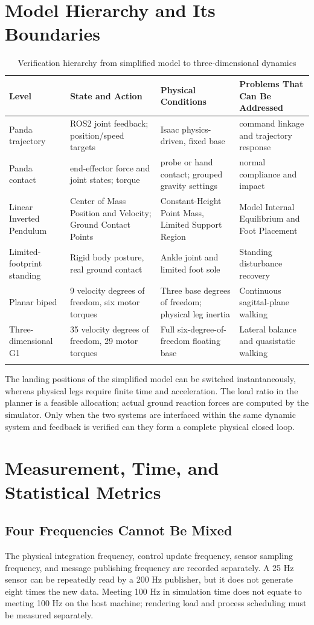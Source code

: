 \section{Model Hierarchy and Its Boundaries}
\begin{longtable}{p{.18\linewidth}p{.24\linewidth}p{.24\linewidth}p{.23\linewidth}}
\toprule Level & State and Action & Physical Conditions & Problems That Can Be Addressed \\\midrule\endhead
Panda trajectory & ROS2 joint feedback; position/speed targets & Isaac physics-driven, fixed base & command linkage and trajectory response\\
Panda contact & end-effector force and joint states; torque & probe or hand contact; grouped gravity settings & normal compliance and impact \\
Linear Inverted Pendulum & Center of Mass Position and Velocity; Ground Contact Points & Constant-Height Point Mass, Limited Support Region & Model Internal Equilibrium and Foot Placement \\
Limited-footprint standing & Rigid body posture, real ground contact & Ankle joint and limited foot sole & Standing disturbance recovery\\
Planar biped & 9 velocity degrees of freedom, six motor torques & Three base degrees of freedom; physical leg inertia & Continuous sagittal-plane walking\\
Three-dimensional G1 & 35 velocity degrees of freedom, 29 motor torques & Full six-degree-of-freedom floating base & Lateral balance and quasistatic walking\\
\bottomrule\caption{Verification hierarchy from simplified model to three-dimensional dynamics}\end{longtable}

The landing positions of the simplified model can be switched instantaneously, whereas physical legs require finite time and acceleration. The load ratio in the planner is a feasible allocation; actual ground reaction forces are computed by the simulator. Only when the two systems are interfaced within the same dynamic system and feedback is verified can they form a complete physical closed loop.
\section{Measurement, Time, and Statistical Metrics}
\subsection{Four Frequencies Cannot Be Mixed}
The physical integration frequency, control update frequency, sensor sampling frequency, and message publishing frequency are recorded separately. A 25 Hz sensor can be repeatedly read by a 200 Hz publisher, but it does not generate eight times the new data. Meeting 100 Hz in simulation time does not equate to meeting 100 Hz on the host machine; rendering load and process scheduling must be measured separately.
